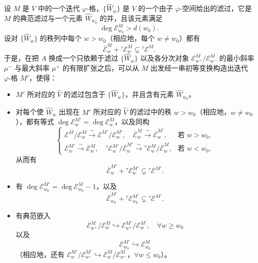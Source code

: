 \begin{proposition*}
设 $M$ 是 $V$ 中的一个迭代 $\varphi$-格，$\{\widehat{W}_w\}$ 是 $V$ 的一个由子 $\varphi$-空间给出的滤过，它是 $M$ 的典范滤过与一个元素 $\widehat{W}_{w_0}$ 的并，且该元素满足
\[
\deg \mathcal{E}^M_{w_0} > d(w_0).
\]
设对 $\{\widehat{W}_w\}$ 的秩列中每个 $w > w_0$（相应地，每个 $w \neq w_0$）都有
\[
\overline{\mathcal{E}}^M_w + {}^\tau\mathcal{E}^M_w \subsetneq {}^\tau\mathcal{E}^M.
\]
于是，在把 $A$ 换成一个只依赖于滤过 $\{\widehat{W}_w\}$ 以及各分次对象 $\mathcal{E}^M_{w^+}/\mathcal{E}^M_{w^-}$ 的最小斜率 $\mu^-$ 与最大斜率 $\mu^+$ 的有限扩张之后，可以从 $M$ 出发经一串初等变换构造出迭代 $\varphi$-格 $M'$，使得：

\begin{itemize}
\item $M'$ 所对应的 $\widehat{V}$ 的滤过包含于 $\{\widehat{W}_w\}$，并且含有元素 $\widehat{W}_{w_0}$。

\item 对每个使 $\widehat{W}_w$ 出现在 $M'$ 所对应的 $\widehat{V}$ 的滤过中的秩 $w > w_0$（相应地，$w \neq w_0$），都有等式 $\deg \mathcal{E}^{M'}_w = \deg \mathcal{E}^M_w$，以及同构
\[
\begin{cases}
\mathcal{E}^M/\mathcal{E}^M_w \xrightarrow{\ \sim\ } \mathcal{E}^{M'}/\mathcal{E}^{M'}_w, \quad
\overline{\mathcal{E}}^M_w \xrightarrow{\ \sim\ } \overline{\mathcal{E}}^{M'}_w, & \text{若 } w > w_0,\\[1mm]
\mathcal{E}^{M'}_w \xrightarrow{\ \sim\ } \mathcal{E}^M_w, \quad
{}^\tau\mathcal{E}^{M'}_w/\overline{\mathcal{E}}^{M'}_w \xrightarrow{\ \sim\ } {}^\tau\mathcal{E}^M_w/\overline{\mathcal{E}}^M_w, & \text{若 } w < w_0,
\end{cases}
\]
从而有
\[
\overline{\mathcal{E}}^{M'}_w + {}^\tau\mathcal{E}^{M'}_w \subsetneq {}^\tau\mathcal{E}^{M'}.
\]

\item 有 $\deg \mathcal{E}^{M'}_{w_0} = \deg \mathcal{E}^M_{w_0} - 1$，以及
\[
\overline{\mathcal{E}}^{M'}_{w_0} + {}^\tau\mathcal{E}^{M'}_{w_0} \subsetneq {}^\tau\mathcal{E}^{M'}.
\]

\item 有典范嵌入
\[
\mathcal{E}^M_{w^+}/\mathcal{E}^M_w \hookrightarrow \mathcal{E}^{M'}_{w^+}/\mathcal{E}^{M'}_w, \quad \forall w \ge w_0
\]
以及
\[
\mathcal{E}^{M'}_{w_0} \hookrightarrow \mathcal{E}^M_{w_0}
\]
（相应地，还有 $\mathcal{E}^{M'}_w/\mathcal{E}^{M'}_{w^-} \hookrightarrow \mathcal{E}^M_w/\mathcal{E}^M_{w^-}$，$\forall w \le w_0$）。
\end{itemize}
\end{proposition*}

